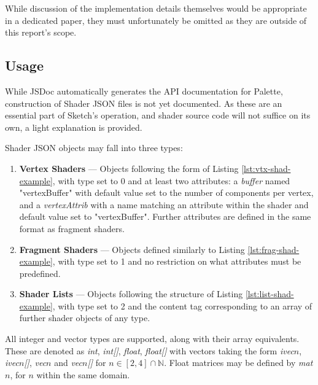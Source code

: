 \documentclass{l3proj}
\begin{document}
While discussion of the implementation details themselves would be appropriate in a dedicated paper, they must unfortunately be omitted as they are outside of this report's scope.

\subsection{Usage}
\label{arch-shad-use}

While JSDoc automatically generates the API documentation for Palette, construction of Shader JSON files is not yet documented. As these are an essential part of Sketch's operation, and shader source code will not suffice on its own, a light explanation is provided.

Shader JSON objects may fall into three types:
\begin{enumerate}
\item \textbf{Vertex Shaders} --- Objects following the form of Listing \ref{lst:vtx-shad-example}, with type set to 0 and at least two attributes: a \textit{buffer} named "vertexBuffer" with default value set to the number of components per vertex, and a \textit{vertexAttrib} with a name matching an attribute within the shader and default value set to "vertexBuffer". Further attributes are defined in the same format as fragment shaders.
\item \textbf{Fragment Shaders} --- Objects defined similarly to Listing \ref{lst:frag-shad-example}, with type set to 1 and no restriction on what attributes must be predefined.
\item \textbf{Shader Lists} --- Objects following the structure of Listing \ref{lst:list-shad-example}, with type set to 2 and the content tag corresponding to an array of further shader objects of any type.
\end{enumerate}
All integer and vector types are supported, along with their array equivalents. These are denoted as \textit{int}, \textit{int[]}, \textit{float}, \textit{float[]} with vectors taking the form \textit{ivec$n$}, \textit{ivec$n$[]}, \textit{vec$n$} and \textit{vec$n$[]} for $ n \in [2,4]\cap\mathbb{N}$. Float matrices may be defined by \textit{mat$n$}, for $n$ within the same domain.
\end{document}
